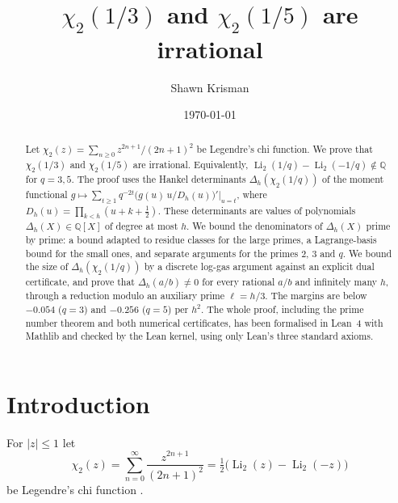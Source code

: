 \documentclass[11pt]{amsart}
\theoremstyle{definition}
\theoremstyle{remark}
\numberwithin{equation}{section}
\newcommand{\QQ}{\mathbb{Q}}
\newcommand{\Li}{\operatorname{Li}}
\begin{document}
\title{\texorpdfstring{$\chi_2(1/3)$ and $\chi_2(1/5)$ are irrational}{chi2(1/3) and chi2(1/5) are irrational}}

\author{Shawn Krisman}


\date{\today}

\begin{abstract}
Let $\chi_2(z)=\sum_{n\ge0}z^{2n+1}/(2n+1)^2$ be Legendre's chi function. We prove that $\chi_2(1/3)$ and
$\chi_2(1/5)$ are irrational. Equivalently, $\Li_2(1/q)-\Li_2(-1/q)\notin\QQ$ for $q=3,5$. The proof uses
the Hankel determinants $\Delta_h(\chi_2(1/q))$ of the moment functional
$g\mapsto\sum_{t\ge1}q^{-2t}\bigl(g(u)\,u/D_h(u)\bigr)'|_{u=t}$, where $D_h(u)=\prod_{k<h}(u+k+\frac12)$.
These determinants are values of polynomials $\Delta_h(X)\in\QQ[X]$ of degree at most $h$. We bound the
denominators of $\Delta_h(X)$ prime by prime: a bound adapted to residue classes for the large primes, a
Lagrange-basis bound for the small ones, and separate arguments for the primes $2$, $3$ and $q$. We bound
the size of $\Delta_h(\chi_2(1/q))$ by a discrete log-gas argument against an explicit dual certificate,
and prove that $\Delta_h(a/b)\ne0$ for every rational $a/b$ and infinitely many $h$, through a reduction modulo
an auxiliary prime $\ell=h/3$. The margins are below $-0.054$ ($q=3$) and $-0.256$ ($q=5$) per $h^2$. The whole
proof, including the prime number theorem and both numerical certificates, has been formalised in Lean~4 with Mathlib
and checked by the Lean kernel, using only Lean's three standard axioms.
\end{abstract}

\maketitle

\tableofcontents

\section{Introduction}\label{sec:intro}

For $|z|\le1$ let
\[
  \chi_2(z)=\sum_{n=0}^{\infty}\frac{z^{2n+1}}{(2n+1)^2}=\tfrac12\bigl(\Li_2(z)-\Li_2(-z)\bigr)
\]
be Legendre's chi function \cite[\S1.8]{Lewin1981}.
\end{document}
